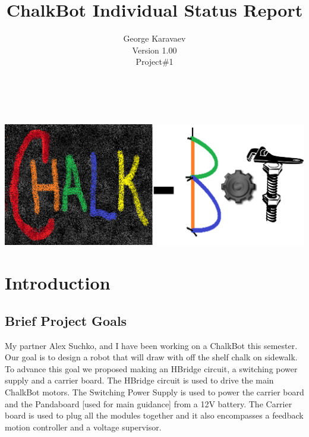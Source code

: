 \documentclass[12pt]{article}
\title{ChalkBot Individual Status Report}
\author{George Karavaev\\ \normalsize Version 1.00 \\Project\#1}
\begin{document}
  \maketitle 
\\
\\
{\centering
\includegraphics[width=1.0\textwidth]{../chalk_bot_logo2.png}
}
\newpage
 \tableofcontents
\listoffigures
\newpage
 \section{Introduction}
 \subsection{Brief Project Goals}
 My partner Alex Suchko, and I have been working on a ChalkBot this semester. Our goal is to design a robot that will draw with off the shelf chalk on sidewalk. To advance this goal we proposed making an HBridge circuit, a switching power supply and a carrier board. The HBridge circuit is used to drive the main ChalkBot motors. The Switching Power Supply is used to power the carrier board and the Pandaboard [used for main guidance] from a 12V battery. The Carrier board is used to plug all the modules together and it also encompasses a feedback motion controller and a voltage supervisor.
\end{document}
